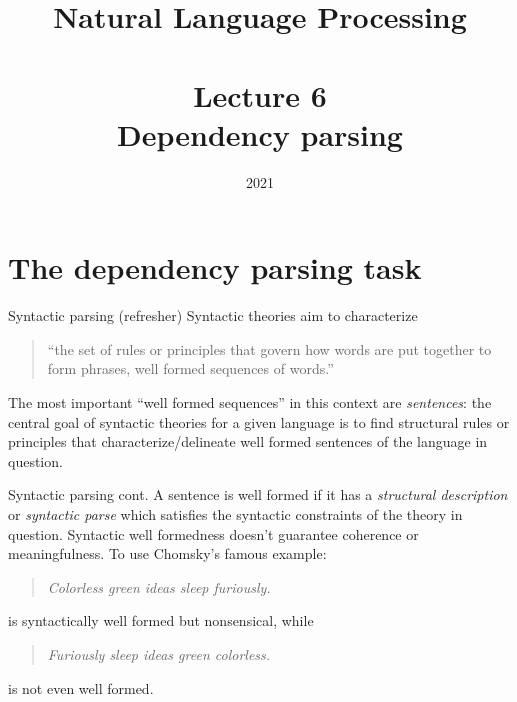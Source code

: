 \documentclass[style=upen, size=14pt]{powerdot}
\theoremstyle{definition}
\begin{document}
\title{Natural Language Processing\\~~\\Lecture 6\\Dependency parsing}

\date{2021}
\maketitle

\section{The dependency parsing task}

\begin{slide}[toc=Syntactic parsing]{Syntactic parsing (refresher)}
  Syntactic theories aim to characterize

  \begin{quote}
  ``the set of rules or principles that
  govern how words are put together to form phrases, well formed sequences of
  words.'' \citep[1]{koopman2013introduction}
\end{quote}

  The most important ``well formed sequences'' in this context are
  \emph{sentences}: the central goal of syntactic theories for a given language
  is to find structural rules or principles that characterize/delineate well
  formed sentences of the language in question.
\end{slide}

\begin{slide}[toc=]{Syntactic parsing cont.}
  A sentence is well formed if it has a \emph{structural description} or
  \emph{syntactic parse} which satisfies the syntactic constraints of the theory in
  question. Syntactic well formedness doesn't guarantee coherence or
  meaningfulness. To use Chomsky's famous example:
  
  \begin{quotation}
    \emph{Colorless green ideas sleep furiously.}
  \end{quotation}
  
  is syntactically well formed but nonsensical, while

  \begin{quotation}
    \emph{Furiously sleep ideas green colorless.}
  \end{quotation}

  is not even well formed.
\end{slide}
\end{document}
